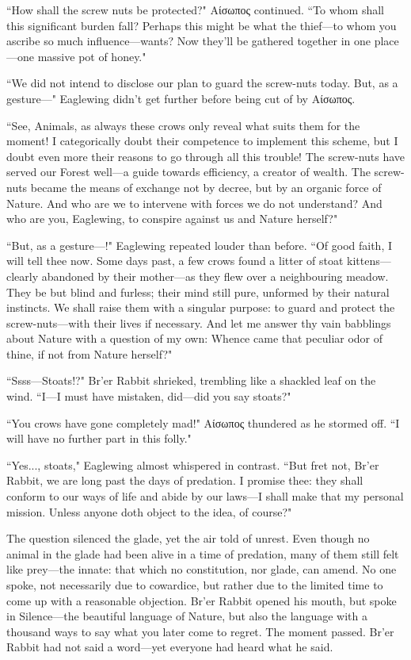 ``How shall the screw nuts be protected?" Αίσωπος continued.
``To whom shall this significant burden fall?
Perhaps this might be what the thief---to whom you ascribe so much influence---wants?
Now they'll be gathered together in one place---one massive pot of honey."

``We did not intend to disclose our plan to guard the screw-nuts today.
But, as a gesture---" Eaglewing didn't get further before being cut of by Αίσωπος.

``See, Animals, as always these crows only reveal what suits them for the moment!
I categorically doubt their competence to implement this scheme, but I doubt even more their reasons to go through all this trouble!
The screw-nuts have served our Forest well---a guide towards efficiency, a creator of wealth.
The screw-nuts became the means of exchange not by decree, but by an organic force of Nature.
And who are we to intervene with forces we do not understand?
And who are you, Eaglewing, to conspire against us and Nature herself?"

``But, as a gesture---!" Eaglewing repeated louder than before.
``Of good faith, I will tell thee now.
Some days past, a few crows found a litter of stoat kittens---clearly abandoned by their mother---as they flew over a neighbouring meadow.
They be but blind and furless; their mind still pure, unformed by their natural instincts.
We shall raise them with a singular purpose: to guard and protect the screw-nuts---with
their lives if necessary.
And let me answer thy vain babblings about Nature with a question of my own: Whence came that peculiar odor of thine, if not from Nature herself?"

``Ssss---Stoats!?" Br'er Rabbit shrieked, trembling like a shackled leaf on the wind.
``I---I must have mistaken, did---did you say stoats?"

``You crows have gone completely mad!" Αίσωπος thundered as he stormed off. ``I will have no further part in this folly."

``Yes..., stoats," Eaglewing almost whispered in contrast.
``But fret not, Br'er Rabbit, we are long past the days of predation.
I promise thee: they shall conform to our ways of life and abide by our laws---I shall make that my personal mission.
Unless anyone doth object to the idea, of course?"

The question silenced the glade, yet the air told of unrest.
Even though no animal in the glade had been alive in a time of predation, many of them still felt like prey---the innate: that which no constitution, nor glade, can amend.
No one spoke, not necessarily due to cowardice, but rather due to the limited time to come up with a reasonable objection.
Br'er Rabbit opened his mouth, but spoke in Silence---the beautiful language of Nature, but also the language with a thousand ways to say what you later come to regret.
The moment passed.
Br'er Rabbit had not said a word---yet everyone had heard what he said.

